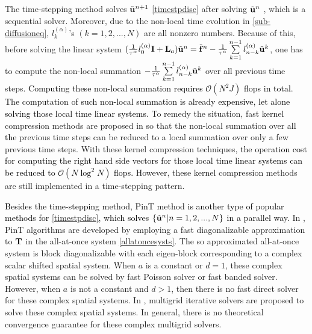 \documentclass[11pt]{article}%
\numberwithin{equation}{section}
\begin{document}
The time-stepping method solves $\tilde{\bf u}^{n+1}$ \eqref{timestpdisc} after solving $\tilde{\bf u}^{n}$ , which is a sequential solver. Moreover, due to the non-local time evolution in \eqref{sub-diffusioneq}, $l_k^{(\alpha)}$'s $(k=1,2,...,N)$ are all nonzero numbers. Because of this, before solving the linear system $(\frac{1}{\tau^{\alpha}}l_0^{(\alpha)}{\bf I}+{\bf L}_a)\tilde{\bf u}^n=\tilde{\bf f}^{n}-\frac{1}{\tau^{\alpha}}\sum\limits_{k=1}^{n-1}l_{n-k}^{(\alpha)}\tilde{\bf u}^{k}$, one has to compute the non-local summation $-\frac{1}{\tau^{\alpha}}\sum\limits_{k=1}^{n-1}l_{n-k}^{(\alpha)}\tilde{\bf u}^{k}$ over all previous time steps. \textcolor{black}{Computing these non-local summation requires $\mathcal{O}(N^2J)$ flops in total. The computation of such non-local summation is already expensive, let alone solving \textcolor{black}{those} local time linear systems.} To remedy the situation, fast kernel compression methods are proposed in \cite{jiang2017fast,mclean2012fast,li2010fast,baffet2017kernel} so that the non-local summation over  \textcolor{black}{all the} previous time steps can be reduced to a local summation over only a few previous time steps. With these kernel compression techniques, \textcolor{black}{the operation cost for computing the right hand side vectors for those local time linear systems can be reduced to $\mathcal{O}(N\log^2 N)$ flops.} However, these kernel compression methods are still implemented in a time-stepping pattern.

\textcolor{black}{Besides the time-stepping method, PinT method is another type of popular methods for \eqref{timestpdisc}, which solves  $\{\tilde{\bf u}^{n}|n=1,2,...,N\}$ in a parallel way.}  In \cite{lin2016fast,gu2020109576,lupangsun,lu2017Approximate}, PinT algorithms are developed by employing a fast diagonalizable approximation to ${\bf T}$ in the all-at-once system \eqref{allatoncesysts}. The so approximated all-at-once system is block diagonalizable with each eigen-block corresponding to a complex scalar shifted spatial system. When $a$ is a constant or $d=1$, these complex spatial systems can be solved by fast Poisson solver or fast banded solver. However, when $a$ is not a constant and $d>1$, then there is no fast direct solver for these complex spatial systems. In \cite{lin2016fast}, multigrid iterative solvers are proposed to solve these complex spatial systems. In general, there is no theoretical convergence guarantee for these complex multigrid solvers. 
\end{document}
